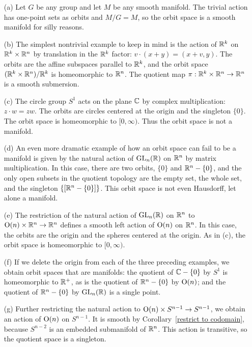 \begin{example}
\mbox{}
\begin{itemize}
\item[(a)] Let $G$ be any group and let $M$ be any smooth manifold. The trivial action has one-point sets as orbits and $M/G=M$, so the orbit space is a smooth manifold for silly reasons.
\item[(b)] The simplest nontrivial example to keep in mind is the action of $\mathbb{R}^k$ on $\mathbb{R}^k\times\mathbb{R}^n$ by translation in the $\mathbb{R}^k$ factor: $v\cdot(x+y)=(x+v,y)$. The orbits are the affine subspaces parallel to $\mathbb{R}^k$, and the orbit space $(\mathbb{R}^k\times\mathbb{R}^n)/\mathbb{R}^k$ is homeomorphic to $\mathbb{R}^n$. The quotient map $\pi:\mathbb{R}^k\times\mathbb{R}^n\to\mathbb{R}^n$ is a smooth submersion.
\item[(c)] The circle group $S^1$ acts on the plane $\mathbb{C}$ by complex multiplication: $z\cdot w=zw$. The orbits are circles centered at the origin and the singleton $\{0\}$. The orbit space is homeomorphic to $[0,\infty)$. Thus the orbit space is not a manifold.
\item[(d)] An even more dramatic example of how an orbit space can fail to be a manifold is given by the natural action of $\mathrm{GL}_n(\mathbb{R})$ on $\mathbb{R}^n$ by matrix multiplication. In this case, there are two orbits, $\{0\}$ and $\mathbb{R}^n-\{0\}$, and the only open subsets in the quotient topology are the empty set, the whole set, and the singleton $\{[\mathbb{R}^n-\{0\}]\}$. This orbit space is not even Hausdorff, let alone a manifold.
\item[(e)] The restriction of the natural action of $\mathrm{GL}_n(\mathbb{R})$ on $\mathbb{R}^n$ to $\mathrm{O}(n)\times\mathbb{R}^n\to\mathbb{R}^n$ defines a smooth left action of $\mathrm{O}(n)$ on $\mathbb{R}^n$. In this case, the orbits are the origin and the spheres centered at the origin. As in (c), the orbit space is homeomorphic to $[0,\infty)$.
\item[(f)] If we delete the origin from each of the three preceding examples, we obtain orbit spaces that are manifolds: the quotient of $\mathbb{C}-\{0\}$ by $S^1$ is homeomorphic to $\mathbb{R}^+$, as is the quotient of $\mathbb{R}^n-\{0\}$ by $\mathrm{O}(n)$; and the quotient of $\mathbb{R}^n-\{0\}$ by $\mathrm{GL}_n(\mathbb{R})$ is a single point.
\item[(g)] Further restricting the natural action to $\mathrm{O}(n)\times S^{n-1}\to S^{n-1}$, we obtain an action of $\mathrm{O}(n)$ on $S^{n-1}$. It is smooth by Corollary~\ref{restrict to codomain}, because $S^{n-2}$ is an embedded submanifold of $\mathbb{R}^n$. This action is transitive, so the quotient space is a singleton.
\end{itemize}
\end{example}
